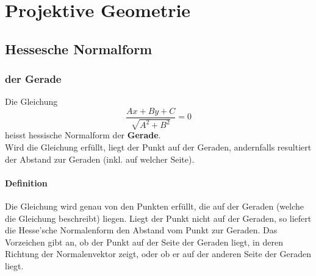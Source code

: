 \chapter{Projektive Geometrie}
\section{Hessesche Normalform}
\subsection{der Gerade}
Die Gleichung \begin{displaymath} \frac{Ax + By + C}{\sqrt{A^{2} + B^{2}}} = 0 \end{displaymath} heisst hessische Normalform der \textbf{Gerade}. \\
Wird die Gleichung erfüllt, liegt der Punkt auf der Geraden, andernfalls resultiert der Abstand  zur Geraden (inkl. auf welcher Seite).
\subsubsection{Definition}
Die Gleichung wird genau von den Punkten erfüllt, die auf der Geraden (welche die Gleichung beschreibt)
liegen. Liegt der Punkt nicht auf der Geraden, so liefert die Hesse’sche Normalenform den Abstand vom Punkt
zur Geraden. Das Vorzeichen gibt an, ob der Punkt auf der Seite der Geraden liegt, in deren Richtung der
Normalenvektor zeigt, oder ob er auf der anderen Seite der Geraden liegt.

